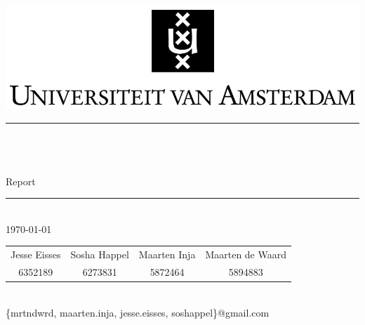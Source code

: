 \newcommand{\HRule}{\rule{\linewidth}{0.5mm}}

\begin{titlepage}
\begin{center}
\includegraphics[width=1\textwidth]{uva}\\[0.5cm]

\HRule \\[0.2cm]
{ \huge \LARGE \textbf{\projectName}\\[0.1cm]
\large \textsc{\projectAbbreviation}\\[0.15cm]
\Large Report
 \vspace{0.2cm}}
\HRule \\[0.4cm]
\Large \today

\vfill

\begin{tabular}{cccc}
Jesse Eisses & Sosha Happel & Maarten Inja & Maarten de Waard \\ 
6352189 & 6273831 & 5872464 & 5894883 
\end{tabular} \\[0.3cm]

\large \{mrtndwrd, maarten.inja, jesse.eisses, soshappel\}@gmail.com 
\end{center}
\end{titlepage}

%
%
